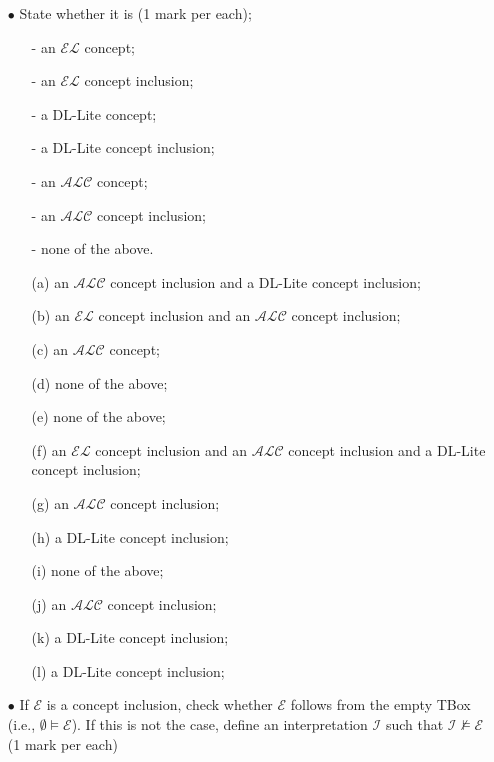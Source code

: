 \documentclass{article}
\newcommand{\alc}{$\mathcal{ALC}$\xspace}
\newcommand{\el}{$\mathcal{EL}$\xspace}
\begin{document}
\begin{itemize}
    \item[$\bullet$] State whether it is (1 mark per each);
    \begin{itemize}
        \item[-] an \el concept;
        \item[-] an \el concept inclusion;
        \item[-] a DL-Lite concept;
        \item[-] a DL-Lite concept inclusion;
        \item[-] an \alc concept;
        \item[-] an \alc concept inclusion;
        \item[-] none of the above.
    \end{itemize}
    \begin{itemize}
    \item[(a)] an \alc concept inclusion and a DL-Lite concept inclusion;
    \item[(b)] an \el concept inclusion and an \alc concept inclusion;
    \item[(c)] an \alc concept;
    \item[(d)] none of the above;
    \item[(e)] none of the above;
    \item[(f)] an \el concept inclusion and an \alc concept inclusion and a DL-Lite concept inclusion;
    \item[(g)] an \alc concept inclusion;
    \item[(h)] a DL-Lite concept inclusion;
    \item[(i)] none of the above;
    \item[(j)] an \alc concept inclusion;
    \item[(k)] a DL-Lite concept inclusion;
    \item[(l)] a DL-Lite concept inclusion;
\end{itemize}
    \item[$\bullet$] If $\mathcal{E}$ is a concept inclusion, check whether $\mathcal{E}$ follows from the empty TBox (i.e., $\emptyset\models\mathcal{E}$). If this is not the case, define an interpretation $\mathcal{I}$ such that $\mathcal{I}\not\models\mathcal{E}$ (1 mark per each)
\end{itemize}
\end{document}
